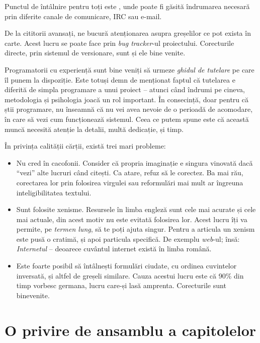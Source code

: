 Punctul de întâlnire pentru toți este {\phpro}, unde poate fi găsită îndrumarea
necesară prin diferite canale de comunicare, IRC sau e-mail.

De la cititorii avansați, ne bucură atenționarea asupra greșelilor ce pot exista
în carte. Acest lucru se poate face prin \textit{bug tracker}-ul proiectului.
Corecturile directe, prin sistemul de versionare, sunt și ele bine venite.

Programatorii cu experiență sunt bine veniți să urmeze \textsl{ghidul de
tutelare} pe care îl punem la dispoziție. Este totuși demn de menționat faptul
că tutelarea e diferită de simpla programare a unui proiect -- atunci când
îndrumi pe cineva, metodologia și psihologia joacă un rol important. În
consecință, doar pentru că știi programare, nu înseamnă că nu vei avea nevoie de
o perioadă de acomodare, în care să vezi cum funcționează sistemul. Ceea ce
putem spune este că această muncă necesită atenție la detalii, multă dedicație,
și timp.

În privința calității cărții, există trei mari probleme:
\begin{itemize}

\item Nu cred în cacofonii. Consider că propria imaginație e singura vinovată
    dacă ``vezi'' alte lucruri când citești. Ca atare, refuz să le corectez. Ba
    mai rău, corectarea lor prin folosirea virgulei sau reformulări mai mult ar
    îngreuna inteligibilitatea textului.

\item Sunt folosite xenisme. Resursele în limba engleză sunt cele mai acurate și
    cele mai actuale, din acest motiv nu este evitată folosirea lor. Acest lucru
    îți va permite, pe \textit{termen lung}, să te poți ajuta singur. Pentru
    a articula un xenism este pusă o cratimă, și apoi particula specifică. De
    exemplu \textsl{web}-ul; însă: \textit{Internetul} -- deoarece cuvântul
    internet există în limba română.

\item Este foarte posibil să întâlnești formulări ciudate, cu ordinea cuvintelor
    inversată, și altfel de greșeli similare. Cauza acestui lucru este că 90\%
    din timp vorbesc germana, lucru care-și lasă amprenta.  Corecturile sunt
    binevenite.

\end{itemize}

\section*{O privire de ansamblu a capitolelor}
{}

